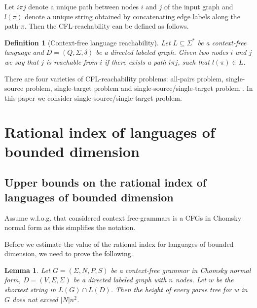 \documentclass[11pt,a4paper]{article} %
\newtheorem{lemma}{Lemma}
\newtheorem{definition}{Definition}
\begin{document}
Let $i\pi j$ denote a unique path between nodes $i$ and $j$ of the input graph and $l(\pi)$ denote a unique string obtained by concatenating edge labels along the path $\pi$. Then the CFL-reachability can be defined as follows.
\begin{definition}[Context-free language reachability]
Let $L \subseteq \Sigma^*$ be a context-free language and $D = (Q, \Sigma, \delta)$ be a directed labeled graph. Given two nodes $i$ and $j$ we say that $j$ is \textit{reachable} from $i$ if there exists a path $i \pi j$, such that $l(\pi) \in L$. 
\end{definition}
There are four varieties of CFL-reachability problems: all-pairs problem, single-source problem, single-target problem and single-source/single-target problem \cite{RepsBasic}. In this paper we consider single-source/single-target problem. 



\section{Rational index of languages of bounded dimension}
\label{sec:osc}
\subsection{Upper bounds on the rational index of languages of bounded dimension}
Assume w.l.o.g. that considered context free-grammars is a CFGs in Chomsky normal form as this simplifies the notation. 


Before we estimate the value of the rational index for languages of bounded dimension, we need to prove the following.
\begin{lemma}
\label{lem:treeheight}
Let  $G = (\Sigma, N, P, S)$ be a context-free grammar in Chomsky normal form,  $D=(V, E, \Sigma)$ be a directed labeled graph with $n$ nodes. Let $w$ be the shortest string in $L(G)\cap L(D)$. Then the height of every parse tree for $w$ in $G$ does not exceed $|N|n^2$.
\end{lemma}
\end{document}
